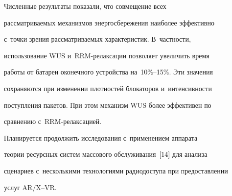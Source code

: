      Численные результаты показали, что совмещение всех 


рассматриваемых механизмов энергосбережения наиболее эффективно 


с~точки зрения рассматриваемых характеристик. В~част\-ности, 


использование WUS и~RRM-ре\-лак\-са\-ции позволяет увеличить время 


работы от батареи оконечного устройства на~10\%--15\%. Эти значения 


сохраняются при изменении плотностей блокаторов и~интенсивности 


поступления пакетов. При этом механизм WUS более эффективен по 


сравнению с~RRM-ре\-лак\-са\-цией.


     


     Планируется продолжить исследования с~применением аппарата 


теории ресурсных сис\-тем массового обслуживания~[14] для анализа 


сценариев с~несколькими технологиями радиодоступа при предоставлении 


услуг AR/X--VR.








